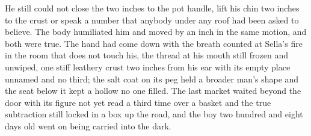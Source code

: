 He still could not close the two inches to the pot handle, lift his chin two inches to the crust or speak a number that anybody under any roof had been asked to believe. The body humiliated him and moved by an inch in the same motion, and both were true. The hand had come down with the breath counted at Sella's fire in the room that does not touch his, the thread at his mouth still frozen and unwiped, one stiff leathery crust two inches from his ear with its empty place unnamed and no third; the salt coat on its peg held a broader man's shape and the seat below it kept a hollow no one filled. The last market waited beyond the door with its figure not yet read a third time over a basket and the true subtraction still locked in a box up the road, and the boy two hundred and eight days old went on being carried into the dark.
